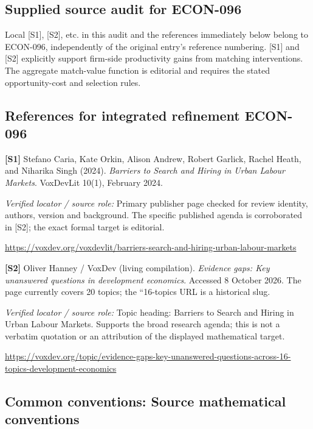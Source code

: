 \documentclass[11pt,a4paper]{article}
\begin{document}
\subsection*{Supplied source audit for ECON-096}
Local [S1], [S2], etc. in this audit and the references immediately below
belong to ECON-096, independently of the original entry's reference numbering.
[S1] and [S2] explicitly support firm-side productivity gains from matching interventions. The aggregate match-value function is editorial and requires the stated opportunity-cost and selection rules.
\subsection*{References for integrated refinement ECON-096}
{\footnotesize\raggedright
\par\noindent\textbf{[S1]} Stefano Caria, Kate Orkin, Alison Andrew, Robert Garlick, Rachel Heath, and Niharika Singh (2024). \emph{Barriers to Search and Hiring in Urban Labour Markets}. VoxDevLit 10(1), February 2024.\par \textit{Verified locator / source role:} Primary publisher page checked for review identity, authors, version and background. The specific published agenda is corroborated in [S2]; the exact formal target is editorial.\par \url{https://voxdev.org/voxdevlit/barriers-search-and-hiring-urban-labour-markets}\par\smallskip
\par\noindent\textbf{[S2]} Oliver Hanney / VoxDev (living compilation). \emph{Evidence gaps: Key unanswered questions in development economics}. Accessed 8 October 2026. The page currently covers 20 topics; the ``16-topics URL is a historical slug.\par \textit{Verified locator / source role:} Topic heading: Barriers to Search and Hiring in Urban Labour Markets. Supports the broad research agenda; this is not a verbatim quotation or an attribution of the displayed mathematical target.\par \url{https://voxdev.org/topic/evidence-gaps-key-unanswered-questions-across-16-topics-development-economics}\par\smallskip
}

\subsection*{Common conventions: Source mathematical conventions}
\end{document}
